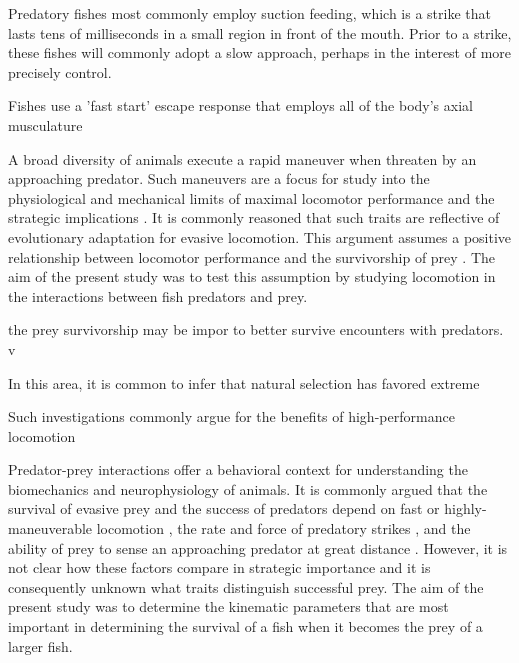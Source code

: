 \documentclass[]{rsos}%
\begin{document}
Predatory fishes most commonly employ suction feeding, which is a strike that lasts tens of milliseconds in a small region in front of the mouth.
Prior to a strike, these fishes will commonly adopt a slow approach, perhaps in the interest of more precisely control.


Fishes use a 'fast start' escape response that employs all of the body's axial musculature 

A broad diversity of animals execute a rapid maneuver when threaten by an approaching predator.
Such maneuvers are a focus for study into the physiological and mechanical limits of maximal locomotor performance and the strategic implications .
It is commonly reasoned that such traits are reflective of evolutionary adaptation for evasive locomotion.
This argument assumes a positive relationship between locomotor performance and the survivorship of prey .
The aim of the present study was to test this assumption by studying locomotion in the interactions between fish predators and prey. 




 the prey survivorship may be impor to better survive encounters with predators. v   


In this area, it is common to infer that natural selection has favored extreme 

Such investigations commonly argue for the benefits of high-performance locomotion 


Predator-prey interactions offer a behavioral context for understanding the biomechanics and neurophysiology of animals.
It is commonly argued that the survival of evasive prey and the success of predators depend on fast or highly-maneuverable locomotion \cite{Alexander:BbR35qCj, Wilson:2013fda, Walker:2005vn, Domenici:2011tv, Howland:1974ud}, the rate and force of predatory strikes \cite{deVries:2012tc, Holzman:2009uu}, and the ability of prey to sense an approaching predator at great distance \cite{Dill:1972wh, Gabbiani:1999wz}.
However, it is not clear how these factors compare in strategic importance and it is consequently unknown what traits distinguish successful prey. 
The aim of the present study was to determine the kinematic parameters that are most important in determining the survival of a fish when it becomes the prey of a larger fish.
\end{document}
